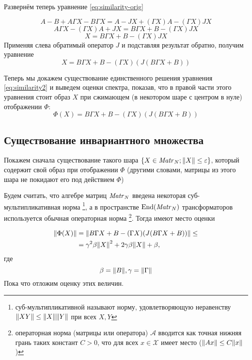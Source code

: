 Развернём теперь уравнение \eqref{eq:similarity-orig}

\[
    A - B + A\Gamma X - B\Gamma X = A - JX + (\Gamma X) A - (\Gamma X) JX
    \]
\[
    A\Gamma X - (\Gamma X) A + JX = B \Gamma X + B - (\Gamma X) JX
    \]
\[
    X = B \Gamma X + B - (\Gamma X) JX
    \]
Применяя слева обратимый оператор \( J \) и подставляя результат обратно, получим уравнение
\begin{equation}\label{eq:similarity2}
    X = B \Gamma X + B - (\Gamma X) (J(B\Gamma X + B))
\end{equation}

Теперь мы докажем существование единственного решения уравнения \eqref{eq:similarity2}
и выведем оценки спектра,
показав, что в правой части этого уравнения стоит образ \( X \)
при сжимающем (в некотором шаре с центром в нуле) отображении \( \Phi \):
\[ \Phi(X) = B \Gamma X + B - (\Gamma X) (J(B\Gamma X + B)) \]

\subsection{Существование инвариантного множества}
Покажем сначала существование такого шара \( \{ X\in\mathit{Matr}_{N} {}; {\left\|{X}\right\|} \leq \varepsilon \} \),
который содержит свой образ при отображении \( \Phi \)
(другими словами, матрицы из этого шара
 не покидают его под действием \( \Phi \))

Будем считать, что алгебре матриц \( \mathit{Matr}_{N} {} \)
введена некоторая суб-мультипликативная норма
\footnote{суб-мультипликативной называют норму, удовлетворяющую неравенству \( {\left\|{XY}\right\|}\leq {\left\|{X}\right\|}{\left\|{Y}\right\|} \) при всех \( X, Y \) },
а в пространстве \( \mathrm{End}({\mathit{Matr}_{N} {}}) \) трансформаторов
используется обычная операторная норма%
\footnote{операторная норма
(матрицы или оператора) \( \mathcal A \)
вводится как точная нижняя грань таких констант \( C > 0 \),
что для всех \( x\in\mathscr X\) имеет место
(\( {\left\|{A x}\right\|} \leq C {\left\|{x}\right\|} \))}.
Тогда имеют место оценки

\begin{align*}
    {\left\|{\Phi(X)}\right\|} &= {\left\|{B \Gamma X + B - (\Gamma X) (J(B\Gamma X + B))}\right\|} \leq \\
    &= \gamma^2\beta{\left\|{X}\right\|}^2 + 2\gamma\beta{\left\|{X}\right\|} + \beta,
\end{align*}
где \[ \beta={\left\|{B}\right\|}, \gamma={\left\|{\Gamma}\right\|} \]
Пока что отложим оценку этих величин.

